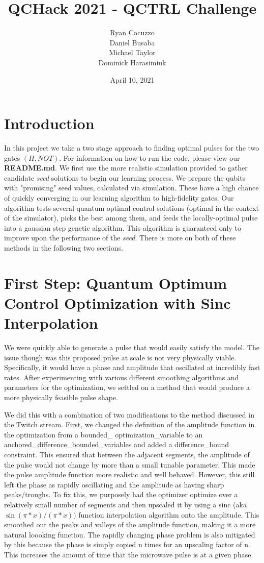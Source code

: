 \documentclass{article}
\title{QCHack 2021 - QCTRL Challenge}
\author{Ryan Cocuzzo \\ Daniel Busaba \\ Michael Taylor \\ Dominick Harasimiuk}
\date{April 10, 2021}
\begin{document}
\maketitle

\section{Introduction}
In this project we take a two stage approach to finding optimal pulses for the two gates $(H, NOT)$.
For information on how to run the code, please view our \textbf{README.md}. We first use the more realistic
simulation provided to gather candidate \textit{seed} solutions to begin our learning process. We prepare the 
qubits with "promising" seed values, calculated via simulation. These have a high chance of quickly converging 
in our learning  algorithm to high-fidelity gates. Our algorithm tests several quantum optimal control solutions 
(optimal in the context of the simulator), picks the best among them, and feeds the locally-optimal pulse into 
a gaussian step genetic algorithm. This algorithm is guaranteed only to improve upon the performance
of the \textit{seed}. There is more on both of these methods in the following two sections.


\section{First Step: Quantum Optimum Control Optimization with Sinc Interpolation}
We were quickly able to generate a pulse that would easily satisfy the model. 
The issue though was this proposed pulse at scale is not very physically viable. Specifically, it would have a phase and amplitude that oscillated at incredibly fast rates.
After experimenting with various different smoothing algorithms and parameters for the 
optimization, we settled on a method that would produce a more physically feasible 
pulse shape.

We did this with a combination of two modifications to the method discussed in the 
Twitch stream. First, we changed the definition of the amplitude function in the optimization from a bounded\_
optimization\_variable to an anchored\_difference\_bounded\_variables and added a difference\_bound constraint. 
This ensured that between the adjacent segments, the amplitude of the pulse would not change by more than a 
small tunable parameter. This made the pulse amplitude function more realistic and well behaved. However, 
this still left the phase as rapidly oscillating and the amplitude as having sharp peaks/troughs. To fix 
this, we purposely had the optimizer optimize over a relatively small number of segments and then upscaled 
it by using a sinc (aka $\sin(\pi * x) / (\pi * x))$ function interpolation algorithm onto the amplitude. This 
smoothed out the peaks and valleys of the amplitude function, making it a more natural loooking function. 
The rapidly changing phase problem is also mitigated by this because the phase is simply copied n times for 
an upscaling factor of n. This increases the amount of time that the microwave pulse is at a given phase. 
\end{document}
